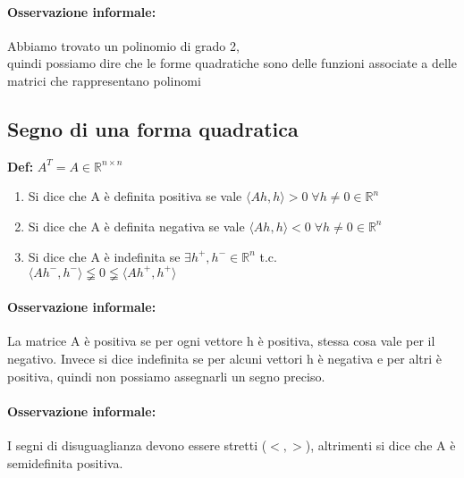 \documentclass[12pt]{article}
\newcommand {\R}{\mathbb{R}}
\begin{document}
\paragraph*{Osservazione informale:}
Abbiamo trovato un polinomio di grado 2,\\
quindi possiamo dire che le forme quadratiche sono delle funzioni
associate a delle matrici che rappresentano polinomi


\subsection{Segno di una forma quadratica}

\textbf{Def:} $A^T = A \in \R^{n\times n}$

\begin{enumerate}
    \item Si dice che A è definita positiva se vale $\langle Ah, h\rangle > 0\; \forall h \neq 0 \in \R ^n$
    \item Si dice che A è definita negativa se vale $\langle Ah, h\rangle < 0\; \forall h \neq 0 \in \R ^n$
    \item Si dice che A è indefinita se $\exists h^+, h^- \in \R ^n$ t.c. \\$\langle Ah^-,h^-\rangle  \lneqq 0 \lneqq \langle Ah^+,h^+ \rangle$
\end{enumerate}

\paragraph*{Osservazione informale:}
La matrice A è positiva se per ogni vettore h è positiva, stessa cosa vale per il negativo.
Invece si dice indefinita se per alcuni vettori h è negativa e per altri è positiva,
quindi non possiamo assegnarli un segno preciso.

\paragraph*{Osservazione informale:}
I segni di disuguaglianza devono essere stretti ($<, >$),
altrimenti si dice che A è semidefinita positiva.\\
\end{document}
